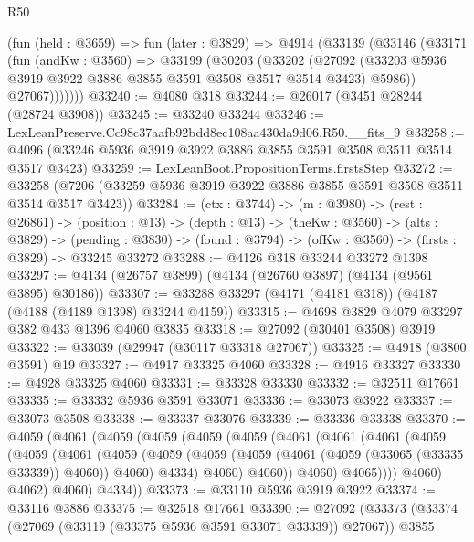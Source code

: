 \begin{lexlean}{R50}
\begin{coremodule}
      (fun (held : @3659) =>
      fun (later : @3829) =>
      @4914
        (@33139
          (@33146
            (@33171
              (fun (andKw : @3560) =>
              @33199
                (@30203
                  (@33202
                    (@27092
                      (@33203 @5936 @3919 @3922 @3886 @3855 @3591 @3508 @3517 @3514 @3423)
                      @5986))
                  @27067)))))))
@33240 := @4080 @318
@33244 := @26017 (@3451 @28244 (@28724 @3908))
@33245 := @33240 @33244
@33246 := LexLeanPreserve.Cc98c37aafb92bdd8ec108aa430da9d06.R50.__fits_9
@33258 := @4096 (@33246 @5936 @3919 @3922 @3886 @3855 @3591 @3508 @3511 @3514 @3517 @3423)
@33259 := LexLeanBoot.PropositionTerms.firstsStep
@33272 := @33258 (@7206 (@33259 @5936 @3919 @3922 @3886 @3855 @3591 @3508 @3511 @3514 @3517 @3423))
@33284 := (ctx : @3744) ->
  (m : @3980) ->
  (rest : @26861) ->
  (position : @13) ->
  (depth : @13) ->
  (theKw : @3560) ->
  (alts : @3829) ->
  (pending : @3830) -> (found : @3794) -> (ofKw : @3560) -> (firsts : @3829) -> @33245 @33272
@33288 := @4126 @318 @33244 @33272 @1398
@33297 := @4134 (@26757 @3899) (@4134 (@26760 @3897) (@4134 (@9561 @3895) @30186))
@33307 := @33288 @33297 (@4171 (@4181 @318)) (@4187 (@4188 (@4189 @1398) @33244 @4159))
@33315 := @4698 @3829 @4079 @33297 @382 @433 @1396 @4060 @3835
@33318 := @27092 (@30401 @3508) @3919
@33322 := @33039 (@29947 (@30117 @33318 @27067))
@33325 := @4918 (@3800 @3591) @19
@33327 := @4917 @33325 @4060
@33328 := @4916 @33327
@33330 := @4928 @33325 @4060
@33331 := @33328 @33330
@33332 := @32511 @17661
@33335 := @33332 @5936 @3591 @33071
@33336 := @33073 @3922
@33337 := @33073 @3508
@33338 := @33337 @33076
@33339 := @33336 @33338
@33370 := @4059
    (@4061
      (@4059
        (@4059
          (@4059
            (@4059
              (@4061
                (@4061
                  (@4061
                    (@4059
                      (@4059
                        (@4061
                          (@4059
                            (@4059
                              (@4059
                                (@4059 (@4061 (@4059 (@33065 (@33335 @33339)) @4060)) @4060)
                                @4334)
                              @4060)
                            @4060))
                        @4060)
                      @4065))))
              @4060)
            @4062)
          @4060)
        @4334))
@33373 := @33110 @5936 @3919 @3922
@33374 := @33116 @3886
@33375 := @32518 @17661
@33390 := @27092
    (@33373
      (@33374 (@27069 (@33119 (@33375 @5936 @3591 @33071 @33339)) @27067))
      @3855

\end{coremodule}
\end{lexlean}
